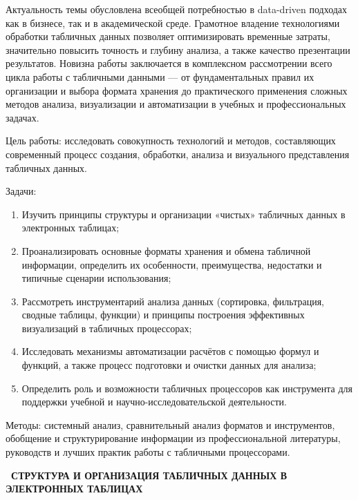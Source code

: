 \documentclass{SibFU-docs}
\begin{document}
Актуальность темы обусловлена всеобщей потребностью в data-driven подходах как в бизнесе, так и в академической среде. Грамотное владение технологиями обработки табличных данных позволяет оптимизировать временные затраты, значительно повысить точность и глубину анализа, а также качество презентации результатов. Новизна работы заключается в комплексном рассмотрении всего цикла работы с табличными данными — от фундаментальных правил их организации и выбора формата хранения до практического применения сложных методов анализа, визуализации и автоматизации в учебных и профессиональных задачах.

Цель работы: исследовать совокупность технологий и методов, составляющих современный процесс создания, обработки, анализа и визуального представления табличных данных.

Задачи:
\begin{enumerate}
\item Изучить принципы структуры и организации «чистых» табличных данных в электронных таблицах;
\item Проанализировать основные форматы хранения и обмена табличной информации, определить их особенности, преимущества, недостатки и типичные сценарии использования;
\item Рассмотреть инструментарий анализа данных (сортировка, фильтрация, сводные таблицы, функции) и принципы построения эффективных визуализаций в табличных процессорах;
\item Исследовать механизмы автоматизации расчётов с помощью формул и функций, а также процесс подготовки и очистки данных для анализа;
\item Определить роль и возможности табличных процессоров как инструмента для поддержки учебной и научно-исследовательской деятельности.
\end{enumerate}

Методы: системный анализ, сравнительный анализ форматов и инструментов, обобщение и структурирование информации из профессиональной литературы, руководств и лучших практик работы с табличными процессорами.

\newpage
\vspace*{-2.5em}
\begin{center}\textbf{\thesection\ СТРУКТУРА И ОРГАНИЗАЦИЯ ТАБЛИЧНЫХ ДАННЫХ В ЭЛЕКТРОННЫХ ТАБЛИЦАХ}\end{center}
\vspace*{-1.5em}
\end{document}
